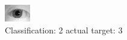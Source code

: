 \begin{figure}[h!]
\begin{center}
\includegraphics[width=0.60\columnwidth]{figures/ID1105_class_2_target_3.png}
\end{center}
\caption{ Classification: 2 actual target: 3}
\label{fig:ID1105_class_2_target_3}
\end{figure}
